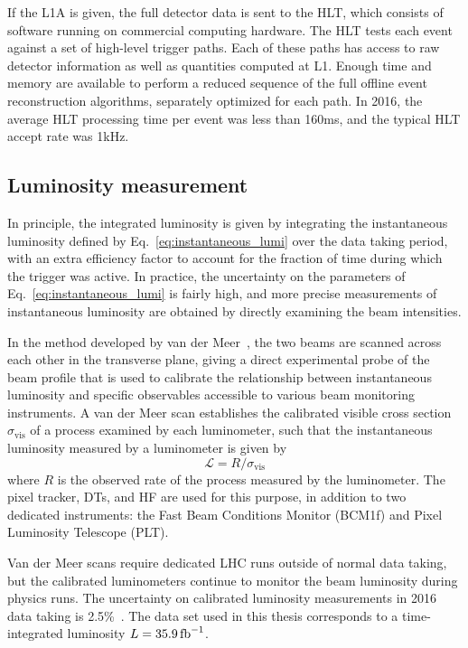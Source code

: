 If the L1A is given, the full detector data is sent to the HLT, which consists of software running on commercial computing hardware.
The HLT tests each event against a set of high-level trigger paths. Each of these paths has access to raw detector information as well
as quantities computed at L1. Enough time and memory are available to perform a reduced sequence of the full offline event reconstruction
algorithms, separately optimized for each path. In 2016, the average HLT processing time per event was less than 160\unit{ms},
and the typical HLT accept rate was 1\unit{kHz}.

\subsection{Luminosity measurement} \label{sec:LHCCMS_CMS_lumi}
In principle, the integrated luminosity is given by integrating the instantaneous luminosity defined by Eq.~\ref{eq:instantaneous_lumi} over the data taking period,
with an extra efficiency factor to account for the fraction of time during which the trigger was active. In practice, the uncertainty on the
parameters of Eq.~\ref{eq:instantaneous_lumi} is fairly high, and more precise measurements of instantaneous luminosity are obtained by directly examining the beam intensities.

In the method developed
by van der Meer~\cite{ref:CERN-ISR-PO-68-31}, the two beams are scanned across each other in the transverse plane, giving a direct experimental
probe of the beam profile that is used to calibrate the relationship between instantaneous luminosity and specific observables accessible to various
beam monitoring instruments. A van der Meer scan establishes the calibrated visible cross section $\sigma_\mathrm{vis}$ of a process examined
by each luminometer, such that the instantaneous luminosity measured by a luminometer is given by
\begin{equation}
\mathcal{L} = R / \sigma_\mathrm{vis}
\label{eq:lumi_calibration}
\end{equation}
where $R$ is the observed rate of the process measured by the luminometer. The pixel tracker, DTs, and HF are used for this purpose, in addition to two
dedicated instruments: the Fast Beam Conditions Monitor (BCM1f) and Pixel Luminosity Telescope (PLT).

Van der Meer scans require dedicated LHC runs outside of normal data taking, but the calibrated luminometers continue to monitor the beam luminosity
during physics runs. The uncertainty on calibrated luminosity measurements in 2016 data taking is 2.5\%~\cite{ref:CMS-PAS-LUM-17-001}.
The data set used in this thesis corresponds to a time-integrated luminosity $L = 35.9\fbinv$.
